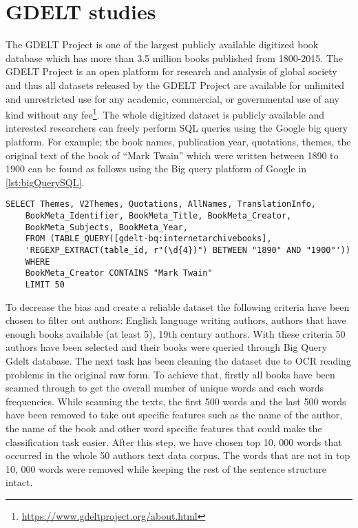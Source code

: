 \section{GDELT studies}
The GDELT Project is one of the largest publicly available digitized book database which has more than 3.5 million books published from 1800-2015. The GDELT Project is an open platform for research and analysis of global society and thus all datasets released by the GDELT Project are available for unlimited and unrestricted use for any academic, commercial, or governmental use of any kind without any fee\footnote{\url{https://www.gdeltproject.org/about.html}}. The whole digitized dataset is publicly available and interested researchers can freely perform SQL queries using the Google big query platform. For example; the book names, publication year, quotations, themes, the original text of the book of “Mark Twain” which were written between 1890 to 1900 can be found as follows
using the Big query platform of Google in \autoref{lst:bigQuerySQL}.
\begin{lstlisting}[frame=none,caption={Google Big Query on GDELT},captionpos=b,label=lst:bigQuerySQL]
	SELECT Themes, V2Themes, Quotations, AllNames, TranslationInfo,
	BookMeta_Identifier, BookMeta_Title, BookMeta_Creator,
	BookMeta_Subjects, BookMeta_Year,
	FROM (TABLE_QUERY([gdelt-bq:internetarchivebooks],
	'REGEXP_EXTRACT(table_id, r"(\d{4})") BETWEEN "1890" AND "1900"'))
	WHERE
	BookMeta_Creator CONTAINS "Mark Twain"
	LIMIT 50
\end{lstlisting}
To decrease the bias and create a reliable dataset the following criteria have been chosen to filter out authors: English language writing authors, authors that have enough books available (at least 5), 19th century authors. With these criteria 50 authors have been selected and their books were queried through Big Query Gdelt database. The next task has been cleaning the dataset due to OCR reading problems in the original raw form. To achieve that, firstly all books have been scanned through
to get the overall number of unique words and each words frequencies. While scanning the texts, the first 500 words and the last 500 words have been removed to take out specific features such as the name of the author, the name of the book and other word specific features that could make the classification task easier. After this step, we have chosen top 10, 000 words that occurred in the whole 50 authors text data corpus. The words that are not in top 10, 000 words were removed while keeping the rest of the sentence structure intact.
